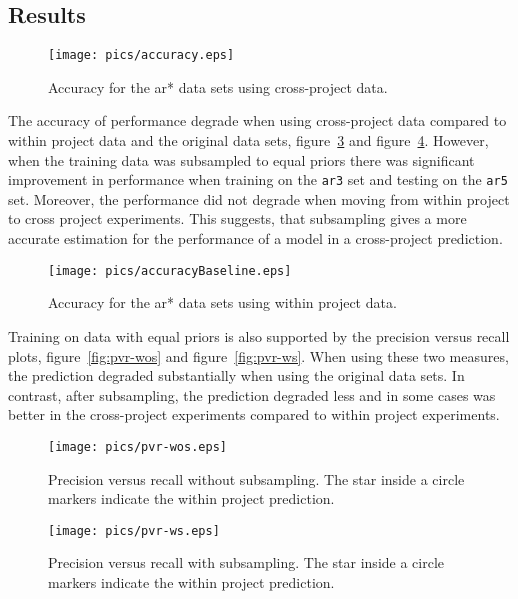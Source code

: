 \documentclass{sig-alternate}
\begin{document}
\subsection{Results}
\begin{figure}[tbp]
\begin{center}
\texttt{[image: pics/accuracy.eps]}
\caption{Accuracy for the ar* data sets using cross-project data.}
\label{fig:accuracy}
\end{center}
\end{figure}
The accuracy of performance degrade when using cross-project data compared to within project data and the
original data sets, figure~\ref{fig:accuracy} and figure~\ref{fig:accuBase}. However, when the training data was
subsampled to equal priors there was significant improvement in performance when training on the {\tt ar3} set
and testing on the {\tt ar5} set. Moreover, the performance did not degrade when moving from within project to
cross project experiments. This suggests, that subsampling gives a more accurate  estimation for the
performance of a model in a cross-project prediction.
\begin{figure}[tbp]
\begin{center}
\texttt{[image: pics/accuracyBaseline.eps]}
\caption{Accuracy for the ar* data sets using within project data.}
\label{fig:accuBase}
\end{center}
\end{figure}
Training on data with equal priors is also supported by the precision versus recall plots, figure~\ref{fig:pvr-wos}
and figure~\ref{fig:pvr-ws}. When using these two measures, the prediction degraded substantially when using
the original data sets. In contrast, after subsampling, the prediction degraded less and in some cases was better
in the cross-project experiments compared to within project experiments.
\begin{figure}[btp]
\begin{center}
\texttt{[image: pics/pvr-wos.eps]}
\caption{Precision versus recall without subsampling. The star inside a circle markers indicate the within project prediction.}
\label{fig:accuracy}
\end{center}
\end{figure}

\begin{figure}[btp]
\begin{center}
\texttt{[image: pics/pvr-ws.eps]}
\caption{Precision versus recall with subsampling. The star inside a circle markers indicate the within project prediction.}
\label{fig:accuBase}
\end{center}
\end{figure}
\end{document}

